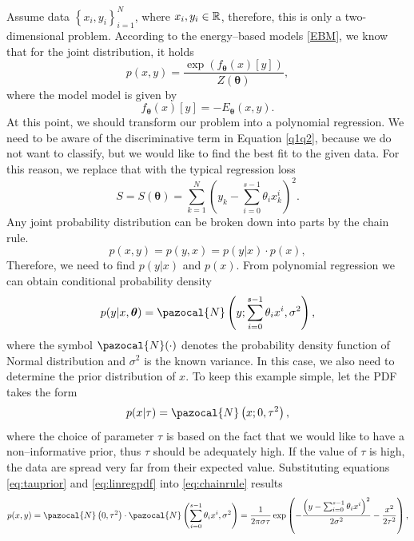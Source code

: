 Assume data $\left\lbrace x_i,y_i \right\rbrace_{i=1}^N$, where $x_i,y_i\in \mathbb{R}$, therefore, this is only a two-dimensional problem.  According to the energy--based models \ref{EBM}, we know that for the joint distribution, it holds
\begin{equation}
	p(x,y) = \frac{\exp{\left(f_{\boldsymbol{\theta}}(x)[y]\right)}}{Z(\boldsymbol{\theta})},
\end{equation}
where the model model is given by 
\begin{equation}
	f_{\boldsymbol{\theta}}(x)[y] = -E_{\boldsymbol{\theta}}(x,y) .
\end{equation}
At this point, we should transform our problem into a polynomial regression. We need to be aware of the discriminative term in Equation \eqref{q1q2}, because we do not want to classify, but we would like to find the best fit to the given data. For this reason, we replace that with the typical regression loss
\begin{equation}\label{S(theta)}
	S = S(\boldsymbol{\theta}) = \sum_{k=1}^N \left(y_k - \sum_{i=0}^{s-1} \theta_i x^i_k\right)^2.
\end{equation}	
Any joint probability distribution can be broken down into parts by the chain rule. 
\begin{equation}\label{eq:chainrule}
	p(x,y) =	p(y,x) = p(y\vert x)\cdot p(x),
\end{equation}
Therefore, we need to find $p(y\vert x)$ and $p(x)$. From polynomial regression we can obtain conditional probability density 
\begin{equation}\label{eq:linregpdf}
	p(y\vert x, \boldsymbol{\theta}) = \pazocal{N}\left(y; \sum_{i=0}^{s-1} \theta_i x^i, \sigma^2 \right),
\end{equation}
where the symbol $\pazocal{N}(\cdot)$ denotes the probability density function of Normal distribution and $\sigma^2$ is the known variance. In this case, we also need to determine the prior distribution of $x$. To keep this example simple, let the PDF takes the form
\begin{equation}\label{eq:tauprior}
	p(x|\tau) = \pazocal{N}\left(x; 0, \tau^2\right),
\end{equation}
where the choice of parameter $\tau$ is based on the fact that we would like to have a non--informative prior, thus $\tau$ should be adequately high. If the value of $\tau$ is high, the data are spread very far from their expected value.  Substituting equations \eqref{eq:tauprior} and \eqref{eq:linregpdf} into \eqref{eq:chainrule} results
\begin{equation}
	p(x,y) = \pazocal{N}\left(0,\tau^2\right) \cdot \pazocal{N}\left(\sum_{i=0}^{s-1} \theta_i x^i, \sigma^2 \right)  =  \frac{1}{2\pi\sigma\tau}\exp\left(-\frac{\left(y-\sum_{i=0}^{s-1} \theta_i x^i\right)^2}{2\sigma^2}-\frac{x^2}{2\tau^2}\right),
\end{equation}
